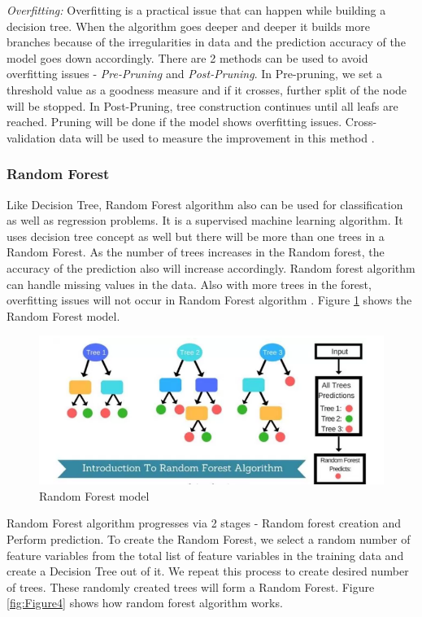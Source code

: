 \documentclass[sigconf]{acmart}
\begin{document}
\textit{Overfitting:} Overfitting is a practical issue that can happen while building a decision tree. When the algorithm goes deeper and deeper it builds more branches because of the irregularities in data and the prediction accuracy of the model goes down accordingly. There are 2 methods can be used to avoid overfitting issues - \emph{Pre-Pruning} and \emph{Post-Pruning}. In Pre-pruning, we set a threshold value as a goodness measure and if it crosses, further split of the node will be stopped. In Post-Pruning, tree construction continues until all leafs are reached. Pruning will be done if the model shows overfitting issues. Cross-validation data will be used to measure the improvement in this method \cite{decision-tree}.

\subsubsection{Random Forest}\label{Random Forest}

Like Decision Tree, Random Forest algorithm also can be used for classification as well as regression problems. It is a supervised machine learning algorithm. It uses decision tree concept as well but there will be more than one trees in a Random Forest. As the number of trees increases in the Random forest, the accuracy of the prediction also will increase accordingly. Random forest algorithm can handle missing values in the data. Also with more trees in the forest, overfitting issues will not occur in Random Forest algorithm \cite{random-forest}. Figure \ref{fig:Figure3} shows the Random Forest model.

\begin{figure}[htb]
  \centering
  \includegraphics[width=1.0\columnwidth]{images/Figure3.png}
  \caption{Random Forest model
  \cite{random-forest}}
  \label{fig:Figure3} 
\end{figure}

Random Forest algorithm progresses via 2 stages - Random forest creation and Perform prediction. To create the Random Forest, we select a random number of feature variables from the total list of feature variables in the training data and create a Decision Tree out of it. We repeat this process to create desired number of trees. These randomly created trees will form a Random Forest. Figure \ref{fig:Figure4} shows how random forest algorithm works. 
\end{document}
